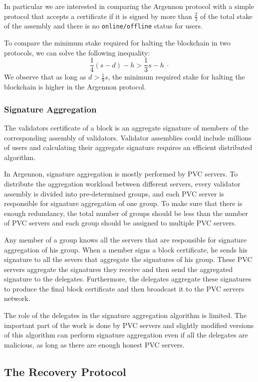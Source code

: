 In particular we are interested in comparing the Argennon protocol with a simple protocol that accepts a certificate
if it is signed by more than $\frac{2}{3}$ of the total stake of the assembly and there is no \texttt{online/offline}
status for users.

To compare the minimum stake required for halting the blockchain in two protocols, we can solve the following
inequality:
\[
    \frac{1}{4}(s-d)-h > \frac{1}{3}s-h\ \cdot
\]
We observe that as long as $d>\frac{1}{9}s$, the minimum required stake for halting the blockchain is higher in the
Argennon protocol.

\subsubsection{Signature Aggregation}\label{subsubsec:sig-agg}

The validators certificate of a block is an aggregate signature of members of the corresponding assembly of
validators. Validator assemblies could include millions of users and calculating their aggregate
signature requires an efficient distributed algorithm.

In Argennon, signature aggregation is mostly performed by PVC servers. To distribute the aggregation workload
between different servers, every validator assembly is divided into pre-determined groups, and each PVC
server is responsible for signature aggregation of one group. To make sure that there is enough redundancy, the
total number of groups should be less than the number of PVC servers and each group should be assigned to
multiple PVC servers.

Any member of a group knows all the servers that are responsible for signature aggregation of his group. When a member
signs a block certificate, he sends his signature to all the severs that aggregate the signatures of his group.
These PVC servers aggregate the signatures they receive and then send the aggregated signature to the delegates.
Furthermore, the delegates aggregate these signatures to produce the final block certificate
and then broadcast it to the PVC servers network.

The role of the delegates in the signature aggregation algorithm is limited. The important part of the work is done by
PVC servers and slightly modified versions of this algorithm can perform signature aggregation
even if all the delegates are malicious, as long as there are enough honest PVC servers.

\subsection{The Recovery Protocol}\label{subsec:recovery}

